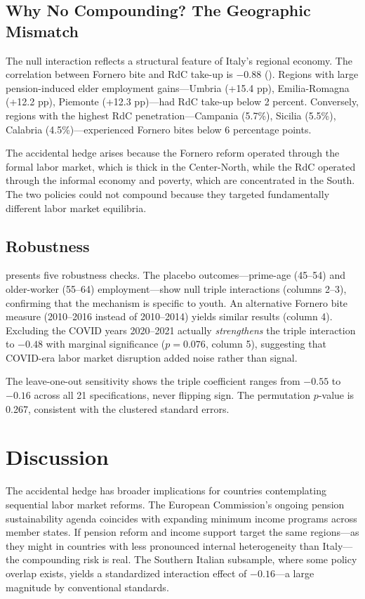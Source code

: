 \documentclass[12pt]{article}
\begin{document}
\subsection{Why No Compounding? The Geographic Mismatch}

The null interaction reflects a structural feature of Italy's regional economy. The correlation between Fornero bite and RdC take-up is $-0.88$ (). Regions with large pension-induced elder employment gains---Umbria (+15.4 pp), Emilia-Romagna (+12.2 pp), Piemonte (+12.3 pp)---had RdC take-up below 2 percent. Conversely, regions with the highest RdC penetration---Campania (5.7\%), Sicilia (5.5\%), Calabria (4.5\%)---experienced Fornero bites below 6 percentage points.

The accidental hedge arises because the Fornero reform operated through the formal labor market, which is thick in the Center-North, while the RdC operated through the informal economy and poverty, which are concentrated in the South. The two policies could not compound because they targeted fundamentally different labor market equilibria.

\subsection{Robustness}



 presents five robustness checks. The placebo outcomes---prime-age (45--54) and older-worker (55--64) employment---show null triple interactions (columns 2--3), confirming that the mechanism is specific to youth. An alternative Fornero bite measure (2010--2016 instead of 2010--2014) yields similar results (column 4). Excluding the COVID years 2020--2021 actually \emph{strengthens} the triple interaction to $-0.48$ with marginal significance ($p = 0.076$, column 5), suggesting that COVID-era labor market disruption added noise rather than signal.

The leave-one-out sensitivity shows the triple coefficient ranges from $-0.55$ to $-0.16$ across all 21 specifications, never flipping sign. The permutation $p$-value is 0.267, consistent with the clustered standard errors.


\section{Discussion}
\label{sec:discussion}

The accidental hedge has broader implications for countries contemplating sequential labor market reforms. The European Commission's ongoing pension sustainability agenda coincides with expanding minimum income programs across member states. If pension reform and income support target the same regions---as they might in countries with less pronounced internal heterogeneity than Italy---the compounding risk is real. The Southern Italian subsample, where some policy overlap exists, yields a standardized interaction effect of $-0.16$---a large magnitude by conventional standards.
\end{document}
